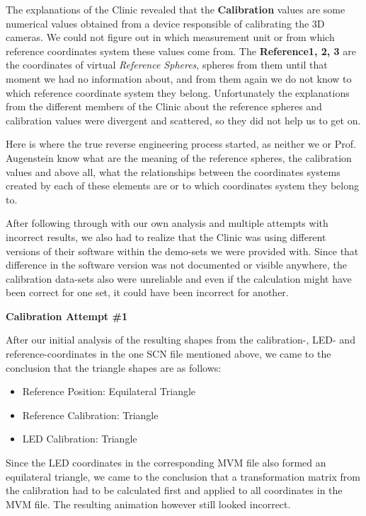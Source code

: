 The explanations of the Clinic revealed that the \textbf{Calibration} values are some numerical values obtained from a device responsible of calibrating the 3D cameras. We could not figure out in which measurement unit or from which reference coordinates system these values come from. The \textbf{Reference1, 2, 3} are the coordinates of  virtual \emph{Reference Spheres}, spheres from them until that moment we had no information about, and from them again we do not know to which reference coordinate system they belong. Unfortunately the explanations from the different members of the Clinic about the reference spheres and calibration values were divergent and scattered, so they did not help us to get on.

Here is where the true reverse engineering process started, as neither we or Prof. Augenstein know what are the meaning of the reference spheres, the calibration values and above all, what the relationships between the coordinates systems created by each of these elements are or to which coordinates system they belong to.

After following through with our own analysis and multiple attempts with incorrect results, we also had to realize that the Clinic was using different versions of their software within the demo-sets we were provided with. Since that difference in the software version was not documented or visible anywhere, the calibration data-sets also were unreliable and even if the calculation might have been correct for one set, it could have been incorrect for another.\newline


\noindent \textbf{Calibration Attempt \#1}\newline

\noindent After our initial analysis of the resulting shapes from the calibration-, LED- and reference-coordinates in the one SCN file mentioned above, we came to the conclusion that the triangle shapes are as follows:
\begin{itemize}
	\item Reference Position: Equilateral Triangle
	\item Reference Calibration: Triangle
	\item LED Calibration: Triangle
\end{itemize}

\noindent Since the LED coordinates in the corresponding MVM file also formed an equilateral triangle, we came to the conclusion that a transformation matrix from the calibration had to be calculated first and applied to all coordinates in the MVM file. The resulting animation however still looked incorrect.\newline


